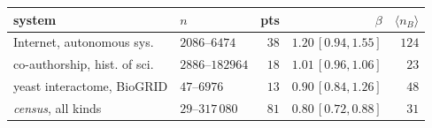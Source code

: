 \begin{center}
\footnotesize\setlength{\tabcolsep}{3pt}
\begin{tabular}{llrrr}
\hline
system & $n$ & pts & $\beta$ & $\langle n_B\rangle$\\
\hline
Internet, autonomous sys. & $2086$--$6474$ & $38$ & $1.20\,[0.94,1.55]$ & $124$\\
co-authorship, hist. of sci. & $2886$--$182964$ & $18$ & $1.01\,[0.96,1.06]$ & $23$\\
yeast interactome, BioGRID & $47$--$6976$ & $13$ & $0.90\,[0.84,1.26]$ & $48$\\
\hline
\emph{census}, all kinds & $29$--$317\,080$ & $81$ & $0.80\,[0.72,0.88]$ & $31$\\
\hline
\end{tabular}
\end{center}
